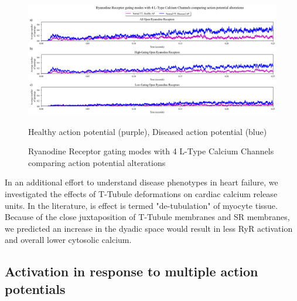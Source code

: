 \documentclass[12pt]{ucsddissertation}
\begin{document}
\setcounter{figure}{10}
\begin{figure}
\centering
	\includegraphics[scale=0.4]{hnhd4RyR_r_Comparison.png}	\caption{Ryanodine Receptor gating modes with 4 L-Type Calcium Channels comparing action potential alterations}Healthy action potential (purple), Diseased action potential (blue)
\label{fig:hnhd 4 LTCC 1 AP RyR} 
\end{figure}

In an additional effort to understand disease phenotypes in heart failure, we investigated the effects of T-Tubule deformations on cardiac calcium release units. In the literature, is effect is termed "de-tubulation" of myocyte tissue. Because of the close juxtaposition of T-Tubule membranes and SR membranes, we predicted an increase in the dyadic space would result in less RyR activation and overall lower cytosolic calcium. 

\subsection{Activation in response to multiple action potentials}
\end{document}
